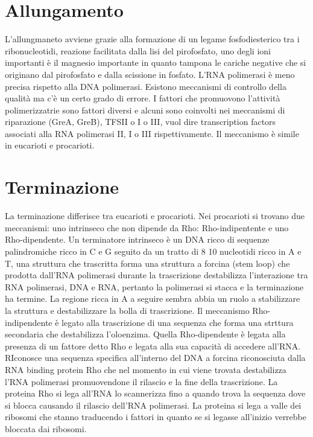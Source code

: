 \section{Allungamento}
L'allungmaneto avviene grazie alla formazione di un legame fosfodiesterico tra i ribonucleotidi, reazione facilitata dalla lisi del pirofosfato, uno degli ioni importanti \`e il magnesio
importante in quanto tampona le cariche negative che si originano dal pirofosfato e dalla scissione in fosfato. L'RNA polimerasi \`e meno precisa rispetto alla DNA polimerasi. Esistono
meccanismi di controllo della qualit\`a ma c'\`e un certo grado di errore. I fattori che promuovono l'attivit\`a polimerizzatrie sono fattori diversi e alcuni sono coinvolti nei 
meccanismi di riparazione (GreA, GreB), TFSII o I o III, vuol dire transcription factors associati alla RNA polimerasi II, I o III rispettivamente. Il meccanismo  \`e simile in eucarioti
e procarioti.
\section{Terminazione}
La terminazione differisce tra eucarioti e procarioti. Nei procarioti si trovano due meccanismi: uno intrinseco che non dipende da Rho: Rho-indipentente e uno Rho-dipendente. Un 
terminatore intrinseco \`e un DNA ricco di sequenze palindromiche ricco in C e G seguito da un tratto di 8 10 nucleotidi ricco in A e T, una struttura che trascritta forma una
struttura a forcina (stem loop) che prodotta dall'RNA polimerasi durante la trascrizione destabilizza l'interazione tra RNA polimerasi, DNA e RNA, pertanto la polimerasi si stacca e 
la terminazione ha termine. La regione ricca in A a seguire sembra abbia un ruolo a stabilizzare la struttura e destabilizzare la bolla di trascrizione. Il meccanismo Rho-indipendente
\`e legato alla trascrizione di una sequenza che forma una strttura secondaria che destabilizza l'oloenzima. Quella Rho-dipendente \`e legata alla presenza di un fattore detto Rho e 
legata alla sua capacit\`a di accedere all'RNA. RIconosce una sequenza specifica all'interno del DNA a forcina riconosciuta dalla RNA binding protein Rho che nel momento in cui viene
trovata destabilizza l'RNA polimerasi promuovendone il rilascio e la fine della trascrizione. La proteina Rho si lega all'RNA lo scannerizza fino a quando trova la sequenza dove si blocca
causando il rilascio dell'RNA polimerasi. La proteina si lega a valle dei ribosomi che stanno traducendo i fattori in quanto se si legasse all'inizio verrebbe bloccata dai ribosomi.


